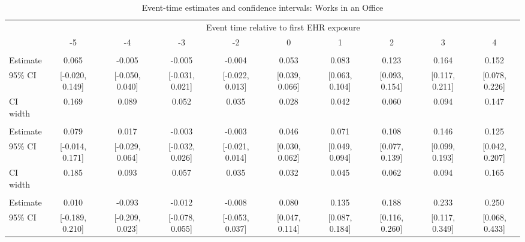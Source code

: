 
\begin{landscape}\begin{table}[!h]
\centering
\caption{\label{tab:ci_work_in_office}Event-time estimates and confidence intervals: Works in an Office}
\centering
\fontsize{9}{11}\selectfont
\begin{tabular}[t]{lccccccccc}
\toprule
\multicolumn{1}{c}{ } & \multicolumn{9}{c}{Event time relative to first EHR exposure} \\
\cmidrule(l{3pt}r{3pt}){2-10}
 & -5 & -4 & -3 & -2 & 0 & 1 & 2 & 3 & 4\\
\midrule
\addlinespace[0.3em]
\multicolumn{10}{l}{\textbf{All}}\\
\hspace{1em}Estimate & 0.065 & -0.005 & -0.005 & -0.004 & 0.053 & 0.083 & 0.123 & 0.164 & 0.152\\
\hspace{1em}95\% CI & {}[-0.020, 0.149] & {}[-0.050, 0.040] & {}[-0.031, 0.021] & {}[-0.022, 0.013] & {}[0.039, 0.066] & {}[0.063, 0.104] & {}[0.093, 0.154] & {}[0.117, 0.211] & {}[0.078, 0.226]\\
\hspace{1em}CI width & 0.169 & 0.089 & 0.052 & 0.035 & 0.028 & 0.042 & 0.060 & 0.094 & 0.147\\
\addlinespace[0.3em]
\multicolumn{10}{l}{\textbf{Age $<$ 60}}\\
\hspace{1em}Estimate & 0.079 & 0.017 & -0.003 & -0.003 & 0.046 & 0.071 & 0.108 & 0.146 & 0.125\\
\hspace{1em}95\% CI & {}[-0.014, 0.171] & {}[-0.029, 0.064] & {}[-0.032, 0.026] & {}[-0.021, 0.014] & {}[0.030, 0.062] & {}[0.049, 0.094] & {}[0.077, 0.139] & {}[0.099, 0.193] & {}[0.042, 0.207]\\
\hspace{1em}CI width & 0.185 & 0.093 & 0.057 & 0.035 & 0.032 & 0.045 & 0.062 & 0.094 & 0.165\\
\addlinespace[0.3em]
\multicolumn{10}{l}{\textbf{Age $\geq$ 60}}\\
\hspace{1em}Estimate & 0.010 & -0.093 & -0.012 & -0.008 & 0.080 & 0.135 & 0.188 & 0.233 & 0.250\\
\hspace{1em}95\% CI & {}[-0.189, 0.210] & {}[-0.209, 0.023] & {}[-0.078, 0.055] & {}[-0.053, 0.037] & {}[0.047, 0.114] & {}[0.087, 0.184] & {}[0.116, 0.260] & {}[0.117, 0.349] & {}[0.068, 0.433]\\

\end{tabular}
\end{table}
\end{landscape}
